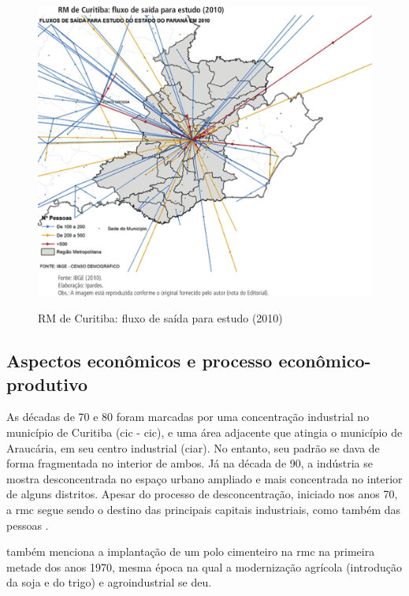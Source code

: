 	\begin{figure}
		\centering
		\caption{RM de Curitiba: fluxo de saída para estudo (2010)}
		\includegraphics[width=1.0\linewidth]{img/costa2015a_08}
		\label{fig:costa2015a_08}
	\end{figure}
	
	\subsection{Aspectos econômicos e processo econômico-produtivo}
	
	As décadas de 70 e 80 foram marcadas por uma concentração industrial no município de Curitiba (\glsdesc{cic} - \gls{cic}), e uma área adjacente que atingia o município de Araucária, em seu centro industrial (\gls{ciar}). No entanto, seu padrão se dava de forma fragmentada no interior de ambos. Já na década de 90, a indústria se mostra desconcentrada no espaço urbano ampliado e mais concentrada no interior de alguns distritos. Apesar do processo de desconcentração, iniciado nos anos 70, a \gls{rmc} segue sendo o destino das principais capitais industriais, como também das pessoas \cite{firkowski2002b}.
	
	 também menciona a implantação de um polo cimenteiro na \glsdesc{rmc} na primeira metade dos anos 1970, mesma época na qual a modernização agrícola (introdução da soja e do trigo) e agroindustrial se deu.
	
